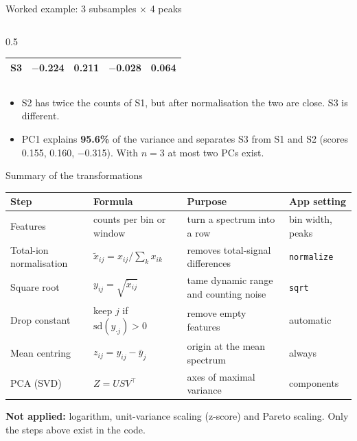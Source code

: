 \documentclass[aspectratio=169,10pt]{beamer}
\newcommand{\hl}[1]{{\color{warm}\bfseries #1}}
\begin{document}
\begin{frame}{Worked example: 3 subsamples $\times$ 4 peaks}
\begin{columns}[T]
\begin{column}{0.5\textwidth}
\begin{tabular}{@{}lrrrr@{}}
        S3 & $-$0.224 & 0.211 & $-$0.028 & 0.064\\\bottomrule
      \end{tabular}
    \end{column}
  \end{columns}
  \vspace{3mm}
  \normalsize
  \begin{itemize}\setlength\itemsep{1mm}
    \item S2 has twice the counts of S1, but after normalisation the two are close. S3 is different.
    \item PC1 explains \hl{95.6\%} of the variance and separates S3 from S1 and S2 (scores 0.155, 0.160, $-$0.315). With $n=3$ at most two PCs exist.
  \end{itemize}
\end{frame}

\begin{frame}{Summary of the transformations}
  \small
  \renewcommand{\arraystretch}{1.25}
  \begin{tabular}{@{}>{\raggedright\arraybackslash}p{2.8cm}>{\raggedright\arraybackslash}p{3.7cm}>{\raggedright\arraybackslash}p{3.9cm}>{\raggedright\arraybackslash}p{2.1cm}@{}}
    \toprule
    \textbf{Step} & \textbf{Formula} & \textbf{Purpose} & \textbf{App setting}\\\midrule
    Features & counts per bin or window & turn a spectrum into a row & bin width, peaks\\
    Total-ion normalisation & $\tilde{x}_{ij}=x_{ij}/\sum_k x_{ik}$ & removes total-signal differences & \texttt{normalize}\\
    Square root & $y_{ij}=\sqrt{\tilde{x}_{ij}}$ & tame dynamic range and counting noise & \texttt{sqrt}\\
    Drop constant & keep $j$ if $\mathrm{sd}(y_{\cdot j})>0$ & remove empty features & automatic\\
    Mean centring & $z_{ij}=y_{ij}-\bar{y}_j$ & origin at the mean spectrum & always\\
    PCA (SVD) & $Z=USV^{\top}$ & axes of maximal variance & components\\\bottomrule
  \end{tabular}
  \vspace{4mm}

  \normalsize
  \hl{Not applied:} logarithm, unit-variance scaling (z-score) and Pareto scaling. Only the steps above exist in the code.
\end{frame}
\end{document}
